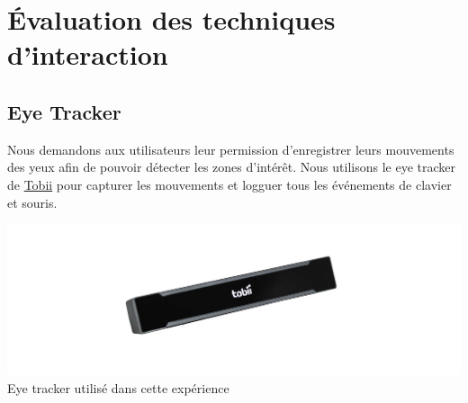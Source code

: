 \documentclass[12pt,a4paper]{article}
\begin{document}
\section{Évaluation des techniques d'interaction}
\subsection{Eye Tracker}
Nous demandons aux utilisateurs leur permission d'enregistrer leurs mouvements des yeux afin de pouvoir détecter les zones d'intérêt. Nous utilisons le eye tracker de \href{https://www.tobii.com/}{Tobii} pour capturer les mouvements et logguer tous les événements de clavier et souris. 
\begin{center}
	\includegraphics[width=1\linewidth]{Tobii.jpg}
	Eye tracker utilisé dans cette expérience
\end{center}
\end{document}
